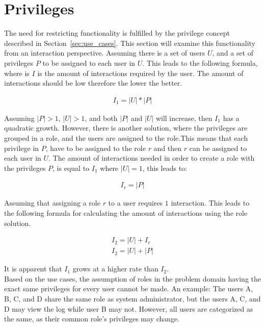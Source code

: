 \section{Privileges}
The need for restricting functionality is fulfilled by the privilege concept described in Section~\ref{sec:use_cases}.
This section will examine this functionality from an interaction perspective.
Assuming there is a set of users $U$, and a set of privileges $P$ to be assigned to each user in $U$.
This leads to the following formula, where is $I$ is the amount of interactions required by the user.
The amount of interactions should be low therefore the lower the better.

\begin{align}
I_1 = |U|*|P|
\end{align}

Assuming $|P| > 1$, $|U| > 1$, and both $|P|$ and $|U|$ will increase, then $I_1$ has a quadratic growth.
However, there is another solution, where the privileges are grouped in a role, and the users are assigned to the role.This means that each privilege in $P$, have to be assigned to the role $r$ and then $r$ can be assigned to each user in $U$.
The amount of interactions needed in order to create a role with the privileges $P$, is equal to $I_1$ where $|U| = 1$, this leads to:

\begin{align}
I_r = |P|
\end{align}

Assuming that assigning a role $r$ to a user requires $1$ interaction.
This leads to the following formula for calculating the amount of interactions using the role solution.

\begin{align}
I_2 = |U|+I_r \\
I_2 = |U|+|P|
\end{align}

It is apparent that $I_1$ grows at a higher rate than $I_2$. \\

Based on the use cases, the assumption of roles in the problem domain having the exact same privileges for every user cannot be made.
An example: The users A, B, C, and D share the same role as system administrator, but the users A, C, and D may view the log while user B may not.
However, all users are categorized as the same, as their common role's privileges may change. \\

